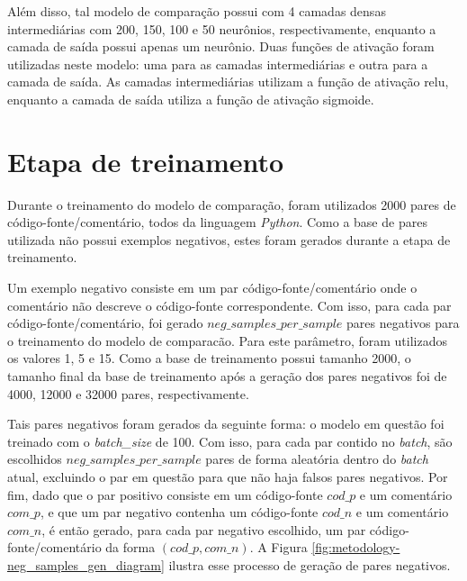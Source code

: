 Além disso, tal modelo de comparação possui com 4 camadas densas intermediárias com 200, 150, 100 e 50 neurônios, respectivamente, enquanto a camada de saída possui apenas um neurônio. Duas funções de ativação foram utilizadas neste modelo: uma para as camadas intermediárias e outra para a camada de saída. As camadas intermediárias utilizam a função de ativação \gls{relu}, enquanto a camada de saída utiliza a função de ativação sigmoide.

\section{Etapa de treinamento}
\label{sec:methodology:embedding-comparator-training}
Durante o treinamento do modelo de comparação, foram utilizados 2000 pares de código-fonte/comentário, todos da linguagem \textit{Python}. Como a base de pares utilizada não possui exemplos negativos, estes foram gerados durante a etapa de treinamento.

Um exemplo negativo consiste em um par código-fonte/comentário onde o comentário não descreve o código-fonte correspondente. Com isso, para cada par código-fonte/comentário, foi gerado $neg\_samples\_per\_sample$ pares negativos para o treinamento do modelo de comparacão. Para este parâmetro, foram utilizados os valores 1, 5 e 15. Como a base de treinamento possui tamanho 2000, o tamanho final da base de treinamento após a geração dos pares negativos foi de 4000, 12000 e 32000 pares, respectivamente.

Tais pares negativos foram gerados da seguinte forma: o modelo em questão foi treinado com o \textit{batch\_size} de 100. Com isso, para cada par contido no \textit{batch}, são escolhidos $neg\_samples\_per\_sample$ pares de forma aleatória dentro do \textit{batch} atual, excluindo o par em questão para que não haja falsos pares negativos. Por fim, dado que o par positivo consiste em um código-fonte $cod\_p$ e um comentário $com\_p$, e que um par negativo contenha um código-fonte $cod\_n$ e um comentário $com\_n$, é então gerado, para cada par negativo escolhido, um par código-fonte/comentário da forma $(cod\_p, com\_n)$. A Figura \ref{fig:metodology-neg_samples_gen_diagram} ilustra esse processo de geração de pares negativos.

